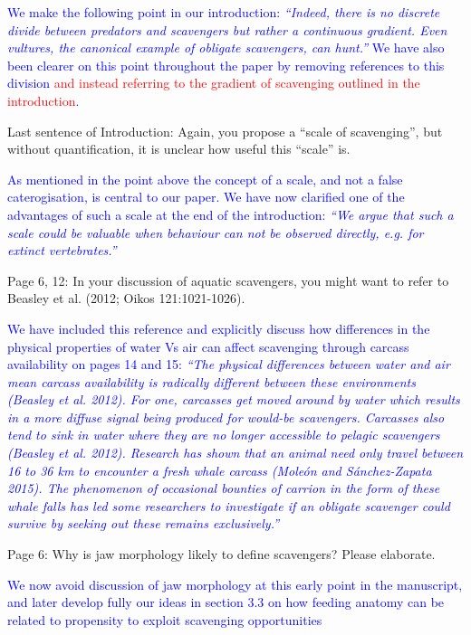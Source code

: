 \documentclass[12pt,letterpaper]{article}
\begin{document}
\begin{enumerate}
{\textcolor{blue} {We make the following point in our introduction: \textit{``Indeed, there is no discrete divide between predators and scavengers but rather a continuous gradient. Even vultures, the canonical example of obligate scavengers, can hunt.''} We have also been clearer on this point throughout the paper by removing references to this division \textcolor{red}{and instead referring to the gradient of scavenging outlined in the introduction}.}

\item{Last sentence of Introduction: Again, you propose a ``scale of scavenging'', but without quantification, it is unclear how useful this ``scale'' is.}

\textcolor{blue}{As mentioned in the point above the concept of a scale, and not a false caterogisation, is central to our paper. We have now clarified one of the advantages of such a scale at the end of the introduction: \textit{``We argue that such a scale could be valuable when behaviour can not be observed directly, e.g. for extinct vertebrates.''}}

\item{Page 6, 12: In your discussion of aquatic scavengers, you might want to refer to Beasley et al. (2012; Oikos 121:1021-1026).}

\textcolor{blue}{We have included this reference and explicitly discuss how differences in the physical properties of water Vs air can affect scavenging \textcolor{blue}{through carcass availability on pages 14 and 15}: \textit{``The physical differences between water and air mean carcass availability is radically different between these environments (Beasley et al. 2012). For one, carcasses get moved around by water which results in a more diffuse signal being produced for would-be scavengers. Carcasses also tend to sink in water where they are no longer accessible to pelagic scavengers (Beasley et al. 2012). Research has shown that an animal need only travel between 16 to 36 km to encounter a fresh whale carcass  (Mole\'{o}n and Sánchez-Zapata 2015). The phenomenon of occasional bounties of carrion in the form of these whale falls has led some researchers to investigate if an obligate scavenger could survive by seeking out these remains exclusively.''}}

\item{Page 6: Why is jaw morphology likely to define scavengers?  Please elaborate.}

\textcolor{blue}{We now avoid discussion of jaw morphology at this early point in the manuscript, and later develop fully our ideas in section 3.3 on how feeding anatomy can be related to propensity to exploit scavenging opportunities}

}
\end{enumerate}
\end{document}
